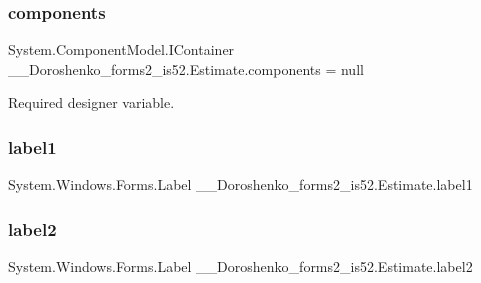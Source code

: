 \subsubsection{\texorpdfstring{components}{components}}
{\footnotesize\ttfamily System.\+Component\+Model.\+I\+Container \+\_\+\_\+\+Doroshenko\+\_\+forms2\+\_\+is52.\+Estimate.\+components = null\hspace{0.3cm}{\ttfamily [private]}}



Required designer variable. 

\hypertarget{class__7___doroshenko__forms2__is52_1_1_estimate_afbe584ac7045dc9e1a19dc64d998a1d7}{}\label{class__7___doroshenko__forms2__is52_1_1_estimate_afbe584ac7045dc9e1a19dc64d998a1d7} 
\subsubsection{\texorpdfstring{label1}{label1}}
{\footnotesize\ttfamily System.\+Windows.\+Forms.\+Label \+\_\+\_\+\+Doroshenko\+\_\+forms2\+\_\+is52.\+Estimate.\+label1\hspace{0.3cm}{\ttfamily [private]}}

\hypertarget{class__7___doroshenko__forms2__is52_1_1_estimate_a61c54a319789d95a13c6b2c482bd3469}{}\label{class__7___doroshenko__forms2__is52_1_1_estimate_a61c54a319789d95a13c6b2c482bd3469} 
\subsubsection{\texorpdfstring{label2}{label2}}
{\footnotesize\ttfamily System.\+Windows.\+Forms.\+Label \+\_\+\_\+\+Doroshenko\+\_\+forms2\+\_\+is52.\+Estimate.\+label2\hspace{0.3cm}{\ttfamily [private]}}

\hypertarget{class__7___doroshenko__forms2__is52_1_1_estimate_aa4b3864be172684094a2988786b3f404}{}\label{class__7___doroshenko__forms2__is52_1_1_estimate_aa4b3864be172684094a2988786b3f404} 
